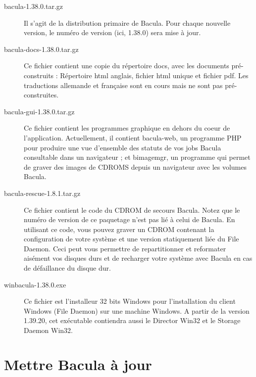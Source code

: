 \begin{description}
\item [bacula-1.38.0.tar.gz]
  Il s'agit de la distribution primaire de Bacula. Pour chaque nouvelle 
  version, le num\'ero de version (ici, 1.38.0) sera mise \`a jour. 

\item [bacula-docs-1.38.0.tar.gz]
  Ce fichier contient une copie du r\'epertoire docs, avec les documents 
  pr\'e-construits : R\'epertoire html anglais, fichier html unique et 
  fichier pdf. Les traductions allemande et fran\c {c}aise sont en cours mais 
  ne sont pas pr\'e-construites.

\item [bacula-gui-1.38.0.tar.gz]
  Ce fichier contient les programmes graphique en dehors du coeur 
  de l'application. Actuellement, il contient bacula-web, un programme 
  PHP pour produire une vue d'ensemble des statuts de vos jobs 
  Bacula consultable dans un navigateur ; et bimagemgr, un programme 
  qui permet de graver des images de CDROMS depuis un navigateur avec 
  les volumes Bacula.
    
\item [bacula-rescue-1.8.1.tar.gz]
  Ce fichier contient le code du CDROM de secours Bacula. Notez 
  que le num\'ero de version de ce paquetage n'est pas li\'e \`a celui 
  de Bacula. En utilisant ce code, vous pouvez graver un CDROM contenant  
  la configuration de votre syst\`eme et une version statiquement li\'ee du 
  File Daemon. Ceci peut vous permettre de repartitionner et reformater 
  ais\'ement vos disques durs et de recharger votre syst\`eme avec Bacula 
  en cas de d\'efaillance du disque dur.

\item [winbacula-1.38.0.exe]
  Ce fichier est l'installeur 32 bits Windows pour l'installation du 
  client Windows (File Daemon) sur une machine Windows.
  A partir de la version 1.39.20, cet exécutable contiendra aussi 
  le Director Win32 et le Storage Daemon Win32.
\end{description}

\label{upgrading1}

\section{Mettre Bacula \`a jour}

